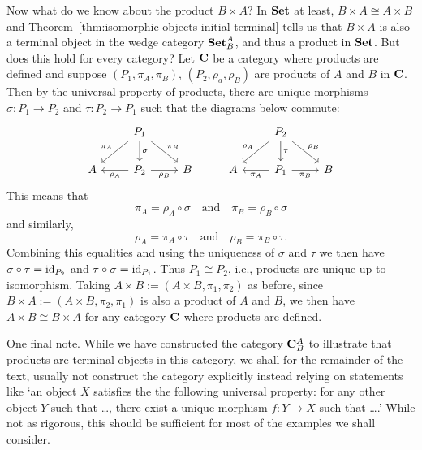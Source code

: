 \begin{example}
    Now what do we know about the product \(B \times A\)? In \(\mathbf{Set}\) at least,
    \(B \times A \cong A \times B\) and
    Theorem~\ref{thm:isomorphic-objects-initial-terminal} tells us that \(B
    \times A\) is also a terminal object in the wedge category \(\mathbf{Set}^A_B\), and
    thus a product in \(\mathbf{Set}\). But does this hold for every category? Let
    \(\mathbf{C}\) be a category where products are defined and suppose \((P_1,
    \pi_A, \pi_B)\), \((P_2, \rho_a, \rho_B)\) are products of \(A\) and \(B\)
    in \(\mathbf{C}\). Then by the universal property of products, there are
    unique morphisms \(\sigma : P_1 \to P_2\) and \(\tau : P_2 \to P_1\) such that the
    diagrams below commute:
    \[
        \begin{tikzcd}
            & P_1 \arrow[ld, "\pi_A"'] \arrow[rd, "\pi_B"] \arrow[d, "\sigma"] &   &   & P_2 \arrow[ld, "\rho_A"'] \arrow[rd, "\rho_B"] \arrow[d, "\tau"] &   \\
          A & P_2 \arrow[l, "\rho_A"] \arrow[r, "\rho_B"']                     & B & A & P_1 \arrow[l, "\pi_A"] \arrow[r, "\pi_B"']                       & B
          \end{tikzcd}
    \]
    This means that
    \[
          \pi_A = \rho_A \circ \sigma \quad \text{and} \quad \pi_B = \rho_B \circ \sigma
    \]
    and similarly,
    \[
          \rho_A = \pi_A \circ \tau \quad \text{and} \quad \rho_B = \pi_B \circ \tau.
    \]
    Combining this equalities and using the uniqueness of \(\sigma\) and \(\tau\) we then have \(\sigma \circ \tau = \operatorname{id}_{P_2}\) and \(\tau \circ \sigma = \operatorname{id}_{P_1}\). Thus \(P_1 \cong P_2\), i.e., products are unique up to isomorphism. Taking \(A \times B := (A \times B, \pi_1, \pi_2)\) as before, since \(B \times A := (A \times B, \pi_2, \pi_1)\) is also a product of \(A\) and \(B\), we then have \(A \times B \cong B \times A\) for any category \(\mathbf{C}\) where products are defined.

    One final note. While we have constructed the category \(\mathbf{C}^A_B\) to
    illustrate that products are terminal objects in this category, we shall for
    the remainder of the text, usually not construct the category explicitly
    instead relying on statements like `an object \(X\) satisfies the the
    following universal property: for any other object \(Y\) such that \dots,
    there exist a unique morphism \(f: Y \to X\) such that \dots.' While not as
    rigorous, this should be sufficient for most of the examples we shall
    consider.
\end{example}